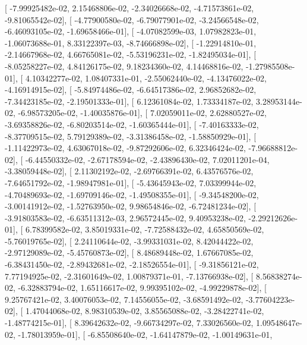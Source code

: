 \documentclass{article}
\begin{document}
       [ -7.99925482e-02,   2.15468806e-02,  -2.34026668e-02,
         -4.71573861e-02,  -9.81065542e-02],
       [ -4.77900580e-02,  -6.79077901e-02,  -3.24566548e-02,
         -6.46093105e-02,  -1.69658466e-01],
       [ -4.07082599e-03,   1.07982823e-01,  -1.06073688e-01,
          8.33122397e-03,  -8.74666898e-02],
       [ -1.22914810e-01,  -2.14667968e-02,   4.66765081e-02,
         -5.53196231e-02,  -1.82495034e-01],
       [ -8.05258227e-02,   4.84126175e-02,   9.18234360e-02,
          4.14468816e-02,  -1.27985508e-01],
       [  4.10342277e-02,   1.08407331e-01,  -2.55062440e-02,
         -4.13476022e-02,  -4.16914915e-02],
       [ -5.84974486e-02,  -6.64517386e-02,   2.96852682e-02,
         -7.34423185e-02,  -2.19501333e-01],
       [  6.12361084e-02,   1.73334187e-02,   3.28953144e-02,
         -6.98573205e-02,  -1.40035876e-01],
       [  7.02059011e-02,   2.62880527e-02,  -3.69358826e-02,
         -6.80203514e-02,  -1.60365444e-01],
       [ -7.40163333e-02,  -8.37709515e-02,   5.79129389e-02,
         -3.31386458e-02,  -1.58850929e-01],
       [ -1.11422973e-02,   4.63067018e-02,  -9.87292606e-02,
          6.32346424e-02,  -7.96688812e-02],
       [ -6.44550332e-02,  -2.67178594e-02,  -2.43896430e-02,
          7.02011201e-04,  -3.38059448e-02],
       [  2.11302192e-02,  -2.69766391e-02,   6.43576576e-02,
         -7.64651792e-02,  -1.98947981e-01],
       [ -5.43645943e-02,   7.03399944e-02,  -4.70489693e-02,
         -1.69709146e-02,  -1.49508355e-01],
       [ -9.34548200e-02,  -3.00141912e-02,  -1.52763950e-02,
          9.98654846e-02,  -6.72481234e-02],
       [ -3.91803583e-02,  -6.63511312e-03,   2.96572445e-02,
          9.40953238e-02,  -2.29212626e-01],
       [  6.78399582e-02,   3.85019331e-02,  -7.72588432e-02,
          4.65850569e-02,  -5.76019765e-02],
       [  2.24110644e-02,  -3.99331031e-02,   8.42044422e-02,
         -2.97129089e-02,  -5.45760873e-02],
       [  8.48689448e-02,   1.67667085e-02,  -6.38431450e-02,
         -2.89432681e-02,  -2.18526554e-01],
       [ -9.31856121e-02,   7.77194925e-02,  -2.31601649e-02,
          1.00879371e-01,  -7.13766938e-02],
       [  8.56838274e-02,  -6.32883794e-02,   1.65116617e-02,
          9.99395102e-02,  -4.99229878e-02],
       [  9.25767421e-02,   3.40076053e-02,   7.14556055e-02,
         -3.68591492e-02,  -3.77604223e-02],
       [  1.47044068e-02,   8.98310539e-02,   3.85565088e-02,
         -3.28422741e-02,  -1.48774215e-01],
       [  8.39642632e-02,  -9.66734297e-02,   7.33026560e-02,
          1.09548647e-02,  -1.78013959e-01],
       [ -6.85508640e-02,  -1.64147879e-02,  -1.00149631e-01,
\end{document}
